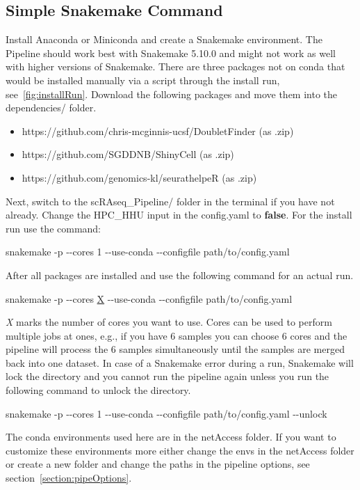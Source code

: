 \subsection{Simple Snakemake Command}
Install Anaconda or Miniconda and create a Snakemake environment. The Pipeline should work best with Snakemake 5.10.0 and might not work as well with higher versions of Snakemake. There are three packages not on conda that would be installed manually via a script through the install run, see~\ref{fig:installRun}. Download the following packages and move them into the dependencies/ folder.
\begin{itemize}
	\item https://github.com/chris-mcginnis-ucsf/DoubletFinder (as .zip)
	\item https://github.com/SGDDNB/ShinyCell (as .zip)
	\item https://github.com/genomics-kl/seurathelpeR (as .zip)
\end{itemize}
Next, switch to the scRAseq\_Pipeline/ folder in the terminal if you have not already. Change the HPC\_HHU input in the config.yaml to \textbf{false}. For the install run use the command:
\begin{center}
	snakemake -p -{}-cores 1 -{}-use-conda -{}-configfile path/to/config.yaml
\end{center}
After all packages are installed and use the following command for an actual run. 
\begin{center}
	snakemake -p -{}-cores \underline{X} -{}-use-conda -{}-configfile path/to/config.yaml
\end{center}
\textit{X} marks the number of cores you want to use. Cores can be used to perform multiple jobs at ones, e.g., if you have 6 samples you can choose 6 cores and the pipeline will process the 6 samples simultaneously until the samples are merged back into one dataset. In case of a Snakemake error during a run, Snakemake will lock the directory and you cannot run the pipeline again unless you run the following command to unlock the directory.
\begin{center}
	snakemake -p -{}-cores 1 -{}-use-conda -{}-configfile path/to/config.yaml -{}-unlock
\end{center}
The conda environments used here are in the netAccess folder. If you want to customize these environments more either change the envs in the netAccess folder or create a new folder and change the paths in the pipeline options, see section~\ref{section:pipeOptions}.


